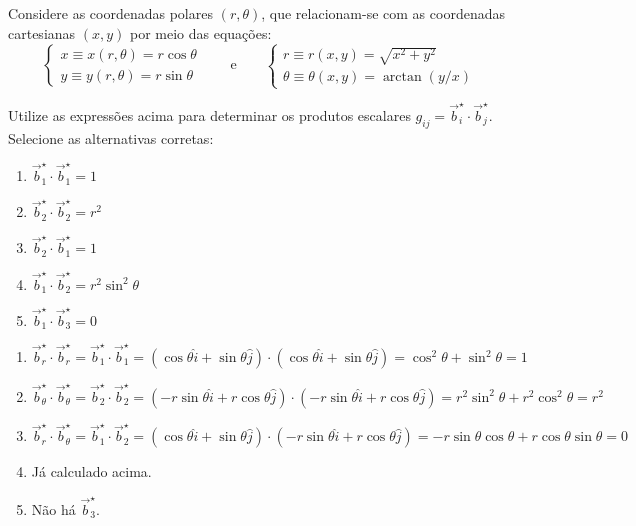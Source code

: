 \begin{question}
    Considere as coordenadas polares $(r,\theta)$, que relacionam-se com as coordenadas cartesianas $(x,y)$ por meio das equações:
    \begin{equation}
      \left\{
      \begin{matrix}
        x \equiv x(r, \theta) = r \cos\theta \\
        y \equiv y(r, \theta) = r \sin\theta
      \end{matrix}
      \right.
      \qquad\text{e}\qquad
      \left\{
      \begin{matrix}
        r \equiv r(x,y) = \sqrt{x^2 + y^2} \\
        \theta \equiv \theta(x,y) = \arctan\left(y/x\right)
      \end{matrix}
      \right.
    \end{equation}

    Utilize as expressões acima para determinar os produtos escalares $g_{ij} = \vec b_i^{\star} \cdot \vec b_j^{\star}$.
    Selecione as alternativas corretas:
    \begin{enumerate}
      \item $\vec b_1^{\star} \cdot \vec b_1^{\star} = 1$ \rightanswer
      \item $\vec b_2^{\star} \cdot \vec b_2^{\star} = r^2$ \rightanswer
      \item $\vec b_2^{\star} \cdot \vec b_1^{\star} = 1$
      \item $\vec b_1^{\star} \cdot \vec b_2^{\star} = r^2 \sin^2\theta$
      \item $\vec b_1^{\star} \cdot \vec b_3^{\star} = 0$
    \end{enumerate}

    \begin{solution}
      \begin{enumerate}
        \item $\vec b_r^{\star} \cdot \vec b_r^{\star} = \vec b_1^{\star} \cdot \vec b_1^{\star} = (\cos\theta \hat i + \sin\theta \hat j) \cdot (\cos\theta \hat i + \sin\theta \hat j) = \cos^2\theta + \sin^2\theta = 1$
        \item $\vec b_\theta^{\star} \cdot \vec b_\theta^{\star} = \vec b_2^{\star} \cdot \vec b_2^{\star} = (-r \sin\theta \hat i + r \cos\theta \hat j) \cdot (-r \sin\theta \hat i + r \cos\theta \hat j) = r^2\sin^2\theta + r^2\cos^2\theta = r^2$
        \item $\vec b_r^{\star} \cdot \vec b_\theta^{\star} = \vec b_1^{\star} \cdot \vec b_2^{\star} = (\cos\theta \hat i + \sin\theta \hat j) \cdot (-r \sin\theta \hat i + r \cos\theta \hat j) = -r \sin\theta \cos\theta + r \cos\theta \sin\theta = 0$
        \item Já calculado acima.
        \item Não há $\vec b_3^\star$.
      \end{enumerate}
    \end{solution}
\end{question}